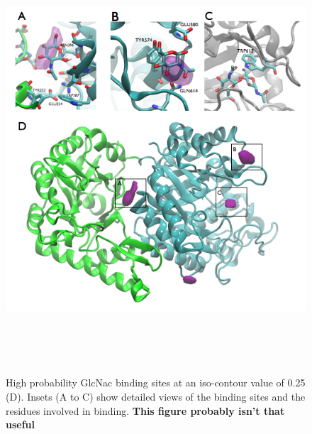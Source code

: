 \begin{figure}[htbp]
\centering
\includegraphics[height=6.29in, width=6.12in]{figures/results4/figure_pgab_binding_sites.png}
\caption[GlcNac binding sites]{High probability GlcNac binding sites at an iso-contour value of 0.25 (D). Insets (A to C) show detailed views of the binding sites and the residues involved in binding. \textbf{This figure probably isn't that useful}}
\label{fig:pgab_binding_sites}
\end{figure}


